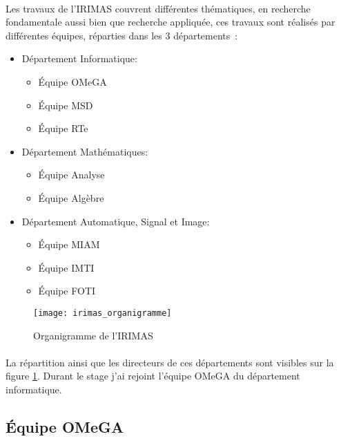\documentclass[a4paper,11pt,twoside,french,report]{../common/simplem}
\begin{document}
				\paragraph*{}
					Les travaux de l'\gls{IRIMAS} couvrent différentes thématiques, en recherche fondamentale aussi bien que recherche appliquée, ces travaux sont réalisés par différentes équipes, réparties dans les 3 départements~\cite{UHA_IRIMAS}:
					\begin{itemize}
						\item Département Informatique:
							\begin{itemize}
								\item Équipe \gls{OMeGA}
								\item Équipe \gls{MSD}
								\item Équipe \gls{RTe}
							\end{itemize}
						\item Département Mathématiques:
							\begin{itemize}
								\item Équipe Analyse
								\item Équipe Algèbre
							\end{itemize}
						\item Département Automatique, Signal et Image:
							\begin{itemize}
								\item Équipe \gls{MIAM}
								\item Équipe \gls{IMTI}
								\item Équipe \gls{FOTI}
							\end{itemize}
					\end{itemize}
					\begin{figure}[H]
						\centering%
						\texttt{[image: irimas\_organigramme]}%
						\caption{Organigramme de l'\acrshort{IRIMAS}~\cite{IRIMAS_Organigramme}}%
						\label{fig:irimas_organigramme}%
					\end{figure}
				\paragraph*{}
					La répartition ainsi que les directeurs de ces départements sont visibles sur la figure \ref{fig:irimas_organigramme}. Durant le stage j'ai rejoint l'équipe \gls{OMeGA} du département informatique.
			\subsection{Équipe \acrshort{OMeGA}}
\end{document}
